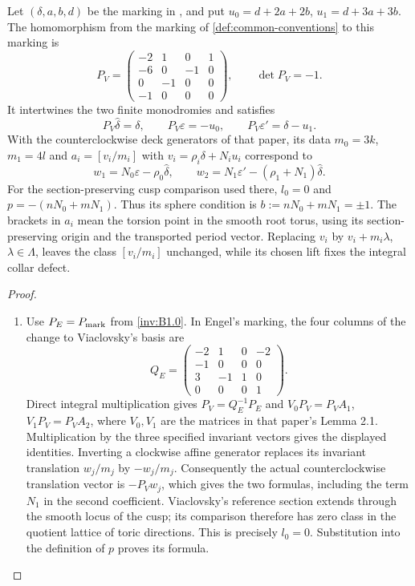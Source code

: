 \begin{proposition}\hypertarget{tag-032R}{}\label{push:src:E.1.1}

Let $(\delta,a,b,d)$ be the marking in
\cite[Section~2, equations~(2.1)--(2.2), p.~3, and (2.7), (2.11)--(2.12), p.~4]{ViaclovskyLog2026},
and put $u_0=d+2a+2b$, $u_1=d+3a+3b$.
The homomorphism from the marking of \cref{def:common-conventions} to this marking is
\[
 P_V=\begin{pmatrix}
 -2&1&0&1\\-6&0&-1&0\\0&-1&0&0\\-1&0&0&0
 \end{pmatrix},\qquad \det P_V=-1.
\]
It intertwines the two finite monodromies and satisfies
\[
 P_V\widehat\delta=\delta,\qquad
 P_V\varepsilon=-u_0,\qquad
 P_V\varepsilon'=\delta-u_1.
\]
With the counterclockwise deck generators of that paper, its data
$m_0=3k$, $m_1=4l$ and
$a_i=[v_i/m_i]$ with $v_i=\rho_i\delta+N_i u_i$ correspond to
\[
 w_1=N_0\varepsilon-\rho_0\widehat\delta,
 \qquad
 w_2=N_1\varepsilon'-(\rho_1+N_1)\widehat\delta.
\]
For the section-preserving cusp comparison used there, $l_0=0$ and
$p=-(nN_0+mN_1)$.  Thus its sphere condition is
$b:=nN_0+mN_1=\pm1$.
The brackets in $a_i$ mean the torsion point in the smooth
root torus, using its section-preserving origin and the
transported period vector.  Replacing $v_i$ by $v_i+m_i\lambda$, $\lambda\in\Lambda$,
leaves the class $[v_i/m_i]$ unchanged, while its chosen lift fixes the integral collar defect.
\end{proposition}


\begin{proof}
\begin{enumerate}[label=\arabic*.,leftmargin=*]
\item Use $P_E=P_{\rm mark}$ from \cref{inv:B1.0}. In Engel's marking,
the four columns of the change to Viaclovsky's basis are
\[
 Q_E=\begin{pmatrix}-2&1&0&-2\\-1&0&0&0\\3&-1&1&0\\0&0&0&1\end{pmatrix}.
\]
Direct integral multiplication gives $P_V=Q_E^{-1}P_E$ and
$V_0P_V=P_VA_1$, $V_1P_V=P_VA_2$, where $V_0,V_1$ are the
matrices in that paper's Lemma 2.1.  Multiplication by the three
specified invariant vectors gives the displayed identities.
Inverting a clockwise affine generator replaces its invariant
translation $w_j/m_j$ by $-w_j/m_j$.  Consequently the actual
counterclockwise translation vector is $-P_Vw_j$, which gives the
two formulas, including the term $N_1$ in the second coefficient.  Viaclovsky's reference section extends through
the smooth locus of the cusp; its comparison therefore has zero
class in the quotient lattice of toric directions.  This is precisely
$l_0=0$.  Substitution into the definition of $p$ proves its formula.

\end{enumerate}
\end{proof}
